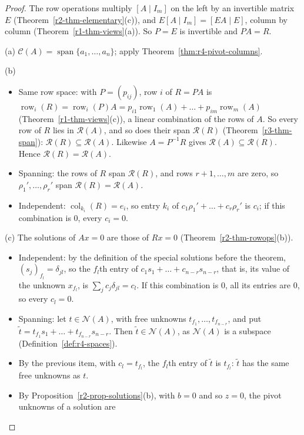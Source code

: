 \documentclass[12pt]{article}
\DeclareMathOperator{\row}{row}
\DeclareMathOperator{\col}{col}
\DeclareMathOperator{\Span}{span}
\theoremstyle{definition}
\begin{document}
\begin{proof}
The row operations multiply \([A\mid I_m]\) on the left by an invertible matrix \(E\)
(Theorem~\ref{r2-thm-elementary}(c)), and \(E[A\mid I_m]=[EA\mid E]\), column by column
(Theorem~\ref{r1-thm-views}(a)). So \(P=E\) is invertible and
\(PA=R\).

(a) \(\mathcal C(A)=\Span\{a_1,\dots,a_n\}\); apply Theorem~\ref{thm:r4-pivot-columns}.

(b)
\begin{itemize}
\item Same row space: with \(P=(p_{ij})\), row \(i\) of \(R=PA\) is
\(\row_i(R)=\row_i(P)A=p_{i1}\row_1(A)+\dots+p_{im}\row_m(A)\) (Theorem~\ref{r1-thm-views}(c)), a linear
combination of the rows of \(A\). So every row of \(R\) lies in \(\mathcal R(A)\), and so does their span
\(\mathcal R(R)\) (Theorem~\ref{r3-thm-span}): \(\mathcal R(R)\subseteq\mathcal R(A)\). Likewise \(A=P^{-1}R\) gives
\(\mathcal R(A)\subseteq\mathcal R(R)\). Hence \(\mathcal R(R)=\mathcal R(A)\).
\item Spanning: the rows of \(R\) span \(\mathcal R(R)\), and rows \(r+1,\dots,m\) are zero, so
\(\rho_1',\dots,\rho_r'\) span \(\mathcal R(R)=\mathcal R(A)\).
\item Independent: \(\col_{k_i}(R)=e_i\), so entry \(k_i\) of \(c_1\rho_1'+\dots+c_r\rho_r'\) is
\(c_i\); if this combination is \(0\), every \(c_i=0\).
\end{itemize}
(c) The solutions of \(Ax=0\) are those of \(Rx=0\) (Theorem~\ref{r2-thm-rowops}(b)).
\begin{itemize}
\item Independent: by the definition of the special solutions before the theorem, \((s_j)_{f_l}=\delta_{jl}\),
so the \(f_l\)th entry of \(c_1s_1+\dots+c_{n-r}s_{n-r}\), that is, its value of the unknown \(x_{f_l}\), is
\(\sum_jc_j\delta_{jl}=c_l\). If this combination is \(0\), all its entries are \(0\), so every \(c_l=0\).
\item Spanning: let \(t\in\mathcal N(A)\), with free unknowns \(t_{f_1},\dots,t_{f_{n-r}}\), and put
\(\tilde t=t_{f_1}s_1+\dots+t_{f_{n-r}}s_{n-r}\). Then \(\tilde t\in\mathcal N(A)\), as \(\mathcal N(A)\) is a
subspace (Definition~\ref{def:r4-spaces}).
\item By the previous item, with \(c_l=t_{f_l}\), the \(f_l\)th entry of \(\tilde t\) is \(t_{f_l}\): \(\tilde t\)
has the same free unknowns as \(t\).
\item By Proposition~\ref{r2-prop-solutions}(b), with \(b=0\) and so \(z=0\), the pivot unknowns of a solution are

\end{itemize}
\end{proof}
\end{document}
